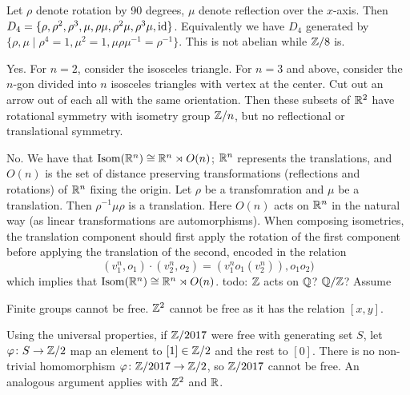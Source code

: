 \begin{ex}
    Let $\rho$ denote rotation by 90 degrees, $\mu$ denote reflection over the $x$-axis. Then $D_4 = \{\rho, \rho^2, \rho ^3,\mu,\rho\mu,\rho^2 \mu,\rho^3\mu,\operatorname{id}\} $. Equivalently we have $D_4$ generated by $\{\rho,\mu \mid \rho^4=1,\mu^2=1,\mu\rho\mu^{-1}=\rho ^{-1}\} $. This is not abelian while $\mathbb{Z}/8$ is.
\end{ex}
\begin{ex}
    Yes. For $n=2$, consider the isosceles triangle. For $n=3$ and above, consider the $n$-gon divided into $n$ isosceles triangles with vertex at the center. Cut out an arrow out of each all with the same orientation. Then these subsets of $\mathbb{R}^2$ have rotational symmetry with isometry group $\mathbb{Z} /n$, but no reflectional or translational symmetry. 
\end{ex}
\begin{ex} 
    No. We have that $\mathrm{Isom}(\mathbb{R}^n ) \cong \mathbb{R}^n  \rtimes O(n)$; $\mathbb{R}^n $ represents the translations, and $O(n)$ is the set of distance preserving transformations (reflections and rotations) of $\mathbb{R}^n $ fixing the origin. Let $\rho$ be a transfomration and $\mu$ be a translation. Then $\rho ^{-1} \mu \rho $ is a translation. Here $O(n)$ acts on $\mathbb{R}^n $ in the natural way (as linear transformations are automorphisms). When composing isometries, the translation component should first apply the rotation of the first component before applying the translation of the second, encoded in the relation \[
        (v_1 ^n , o_1) \cdot (v^n_2, o_2) = (v_1 ^n o_1(v_2^n )), o_1o_2)
    \] which implies that $\mathrm{Isom}(\mathbb{R}^n ) \cong  \mathbb{R}^n \rtimes O(n)$.
    {\color{red}todo:} $\mathbb{Z}$ acts on $\mathbb{Q}$? $\mathbb{Q} / \mathbb{Z}$? Assume 
\end{ex}
\begin{ex}
    Finite groups cannot be free. $\mathbb{Z}^2$ cannot be free as it has the relation $[x,y]$.

    Using the universal properties, if $\mathbb{Z} /2017$ were free with generating set $S$, let $\varphi  \colon S \to \mathbb{Z} /2$ map an element to $[1] \in \mathbb{Z} /2$ and the rest to $[0]$. There is no non-trivial homomorphism $\varphi  \colon \mathbb{Z} /2017 \to \mathbb{Z} /2$, so $\mathbb{Z} /2017$ cannot be free. An analogous argument applies with $\mathbb{Z} ^2$ and $\mathbb{R}$.
\end{ex}
